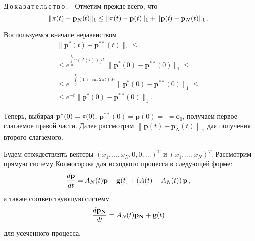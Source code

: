 \begin{multicols}{2}
\medskip


\noindent
Д\,о\,к\,а\,з\,а\,т\,е\,л\,ь\,с\,т\,в\,о\,.\ \ 
Отметим прежде всего, что 
$$
\|{\mathbf \pi}(t) - {\mathbf p}_N (t)\|_{1} \le \|{\bf \pi} (t) - {\mathbf p} (t)\|_{1} + \|{\mathbf p} (t) - 
{\mathbf p}_N (t)\|_{1}\,.
$$

Воспользуемся вначале неравенством
\begin{multline}
\|{\mathbf p}^*(t)-{\mathbf p}^{**}(t)\|_{1} \le{}\\
{}\le  e^{\int\limits_0^t
\gamma\left(A(\tau)\right)_{1} d\tau}\|{\mathbf p}^*(0)-{\mathbf p}^{**}(0)\|_{1} \le {} \\
{}\le  e^{-\int\limits_0^t {(1+\sin{2\pi t})} d\tau}
 \|{\mathbf p}^*(0)-{\mathbf p}^{**}(0)\|_{1} \le{}\\
 {}\le e^{-t} \|{\mathbf p}^*(0)-{\mathbf p}^{**}(0)\|_{1}. \nonumber
\end{multline}

Теперь, выбирая ${\mathbf p}^*(0) = {\bf \pi}(0)$, ${\mathbf p}^{**}(0) = {\mathbf p}(0)=$\linebreak
$= {\mathbf e}_0$, получаем первое слагаемое правой части.
Далее рассмотрим $\left\|{\mathbf p} (t) - {\mathbf p}_N (t)\right\|_{1}$ для получения второго слагаемого.


Будем отождествлять векторы
$\left(x_1,\dots,x_N,0,\right.$\linebreak $\left.0,\dots\right)^{\mathrm{T}}$ и $\left(x_1,\dots,x_N
\right)^T$. Рассмотрим прямую сис\-те\-му Колмогорова  для
исходного процесса  в следующей форме:
\begin{equation*}
\displaystyle\frac{\displaystyle d\mathbf{p}\mathstrut}{\displaystyle dt\mathstrut}=A_N(t) \mathbf{p} + {\bf g}(t) +\left(A(t) -
A_N(t) \right) \mathbf{p}\,,
\end{equation*}
а также соответствующую систему
\begin{equation*}
\displaystyle\frac{\displaystyle d\mathbf{p_N}\mathstrut}{\displaystyle dt\mathstrut}=A_N(t) \mathbf{p_N} +  {\bf g}(t)
\end{equation*}
для усеченного процесса.



\end{multicols}
